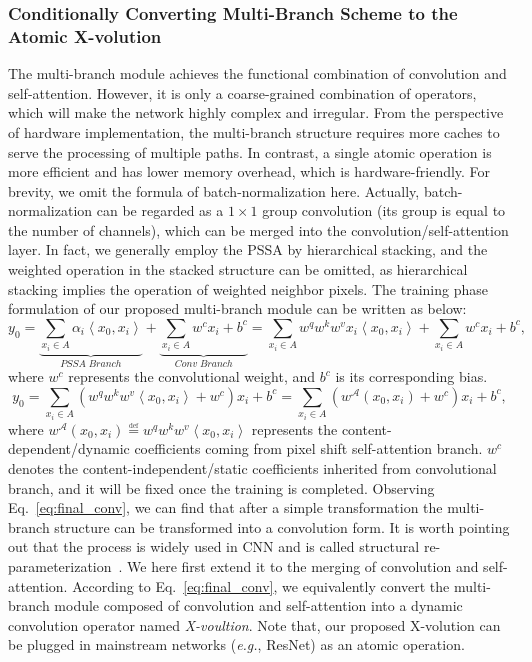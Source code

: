 \documentclass{article}
\begin{document}
\subsubsection{Conditionally Converting Multi-Branch Scheme to the Atomic X-volution}
The multi-branch module achieves the functional combination of convolution and self-attention.
However, it is only a coarse-grained combination of operators, which will make the network highly complex and irregular.
From the perspective of hardware implementation, the multi-branch structure requires more caches to serve the processing of multiple paths.
In contrast, a single atomic operation is more efficient and has lower memory overhead, which is hardware-friendly.
For brevity, we omit the formula of batch-normalization here.
Actually, batch-normalization can be regarded as a $1\times1$ group convolution (its group is equal to the number of channels), which can be merged into the convolution/self-attention layer.
In fact, we generally employ the PSSA by hierarchical stacking, and the weighted operation in the stacked structure can be omitted, as hierarchical stacking implies the operation of weighted neighbor pixels.
The training phase formulation of our proposed multi-branch module can be written as below:
\begin{equation}
y_0 = \underbrace{\sum_{x_i\in A}\alpha_i \left\langle x_0,x_i\right\rangle}_{PSSA\;Branch} + \underbrace{\sum_{x_i\in A} w^c x_i + b^{c}}_{Conv\;Branch}= \sum_{x_i\in A}w^q w^k w^v x_i\left\langle x_0,x_i\right\rangle + \sum_{x_i\in A} w^c x_i + b^{c},
\label{eq:attention}
\end{equation}
where $w^{c}$ represents the convolutional weight, and $b^{c}$ is its corresponding bias.
\begin{equation}
y_0 
=\sum_{x_i\in A}\left(w^q w^k w^v\left\langle x_0,x_i\right\rangle + w^c\right) x_i  + b^c = \sum_{x_i\in A}\left(w^{\mathcal{A}}(x_0,x_i)+w^c\right)x_i + b^c,
\label{eq:final_conv}
\end{equation}
where {\small{$w^{\mathcal{A}}(x_0,x_i)\overset{\underset{\mathrm{def}}{}}{=} w^q w^k w^v\left\langle x_0,x_i\right\rangle$}} represents the content-dependent/dynamic coefficients coming from pixel shift self-attention branch.
$w^{c}$ denotes the content-independent/static coefficients inherited from convolutional branch, and it will be fixed once the training is completed.
Observing Eq.~\ref{eq:final_conv}, we can find that after a simple transformation the multi-branch structure can be transformed into a convolution form.
It is worth pointing out that the process is widely used in CNN and is called structural re-parameterization~\cite{DBLP:journals/corr/abs-2101-03697}.
We here first extend it to the merging of convolution and self-attention.
According to Eq.~\ref{eq:final_conv}, we equivalently convert the multi-branch module composed of convolution and self-attention into a dynamic convolution operator named \emph{X-voultion}.
Note that, our proposed X-volution can be plugged in mainstream networks (\emph{e.g.}, ResNet) as an atomic operation.
\end{document}

